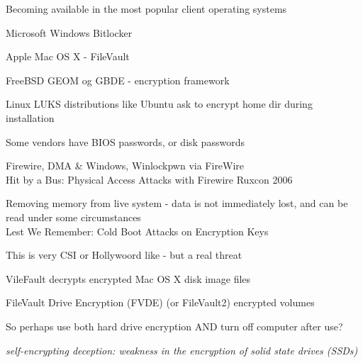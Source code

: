\documentclass[Screen16to9,17pt]{foils}
\begin{document}


\begin{list1}
\item Becoming available in the most popular client operating systems
\begin{list2}
\item Microsoft Windows Bitlocker
\item Apple Mac OS X - FileVault
\item FreeBSD GEOM og GBDE - encryption framework
\item Linux LUKS distributions like Ubuntu ask to encrypt home dir during installation
\item Some vendors have BIOS passwords, or disk passwords
\end{list2}
\end{list1}



\begin{list2}
\item Firewire, DMA \& Windows, Winlockpwn via FireWire\\
Hit by a Bus: Physical Access Attacks with Firewire Ruxcon 2006
\item Removing memory from live system - data is not immediately lost, and can be read under some circumstances\\
Lest We Remember: Cold Boot Attacks on Encryption Keys\\
\item This is very CSI or Hollywoord like - but a real threat
\item VileFault decrypts encrypted Mac OS X disk image files\\ 
\item  FileVault Drive Encryption (FVDE) (or FileVault2) encrypted volumes\\
\end{list2}

\centerline{So perhaps use both hard drive encryption AND turn off computer after use?}


\emph{self-encrypting deception: weakness in the encryption of solid state drives (SSDs)}
\end{document}
